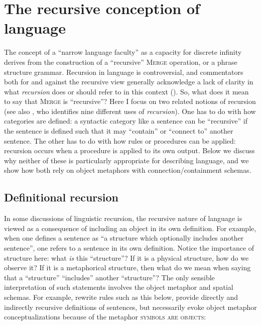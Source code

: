 \section{The recursive conception of language}

The concept of a “narrow language faculty” as a capacity for discrete infinity derives from the construction of a “recursive” \textsc{Merge} operation, or a phrase structure grammar. Recursion in language is controversial, and commentators both for and against the recursive view generally acknowledge a lack of clarity in what \textit{recursion} does or should refer to in this context (\citealt{Lobina2011,PullumScholz2010,Tomalin2011,vanderHulst2010}). So, what does it mean to say that \textsc{Merge} is “recursive”? Here I focus on two related notions of recursion (see also \citealt{Tomalin2011}, who identifies nine different uses of \textit{recursion}). One has to do with how categories are defined: a syntactic category like a sentence can be “recursive” if the sentence is defined such that it may “contain” or “connect to” another sentence. The other has to do with how rules or procedures can be applied: recursion occurs when a procedure is applied to its own output. Below we discuss why neither of these is particularly appropriate for describing language, and we show how both rely on object metaphors with connection/containment schemas.

\subsection{Definitional recursion}

In some discussions of linguistic recursion, the recursive nature of language is viewed as a consequence of including an object in its own definition. For example, when one defines a sentence as “a structure which optionally includes another sentence”, one refers to a sentence in its own definition. Notice the importance of structure here: what \textit{is} this “structure”? If it is a physical structure, how do we observe it? If it is a metaphorical structure, then what do we mean when saying that a “structure” “includes” another “structure”? The only sensible interpretation of such statements involves the object metaphor and spatial schemas. For example, rewrite rules such as this below, provide directly and indirectly recursive definitions of sentences, but necessarily evoke object metaphor conceptualizations because of the metaphor \textsc{symbols are objects}:

